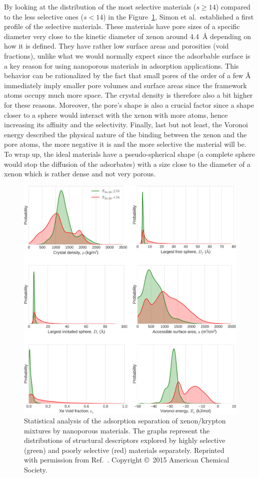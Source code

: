\documentclass[main.tex]{subfiles}
\begin{document}
By looking at the distribution of the most selective materials ($s\geq 14$) compared to the less selective ones ($s<14$) in the Figure~\ref{fgr:Simon2015}, Simon et al.\ established a first profile of the selective materials. These materials have pore sizes of a specific diameter very close to the kinetic diameter of xenon around \SI{4.4}{\angstrom} depending on how it is defined. They have rather low surface areas and porosities (void fractions), unlike what we would normally expect since the adsorbable surface is a key reason for using nanoporous materials in adsorption applications. This behavior can be rationalized by the fact that small pores of the order of a few \si{\angstrom} immediately imply smaller pore volumes and surface areas since the framework atoms occupy much more space. The crystal density is therefore also a bit higher for these reasons. Moreover, the pore's shape is also a crucial factor since a shape closer to a sphere would interact with the xenon with more atoms, hence increasing its affinity and the selectivity. Finally, last but not least, the Voronoi energy described the physical nature of the binding between the xenon and the pore atoms, the more negative it is and the more selective the material will be. To wrap up, the ideal materials have a pseudo-spherical shape (a complete sphere would stop the diffusion of the adsorbates) with a size close to the diameter of a xenon which is rather dense and not very porous.

\begin{figure}[ht]
\centering
  \includegraphics[width=0.7\linewidth]{figures/1-screening/Simon_2015_descriptors.jpeg}
  \caption{Statistical analysis of the adsorption separation of xenon/krypton mixtures by nanoporous materials. The graphs represent the distributions of structural descriptors explored by highly selective (green) and poorly selective (red) materials separately. Reprinted with permission from Ref.~\cite{Simon_2015}. Copyright \copyright\ 2015 American Chemical Society.}\label{fgr:Simon2015}
\end{figure}
\end{document}
